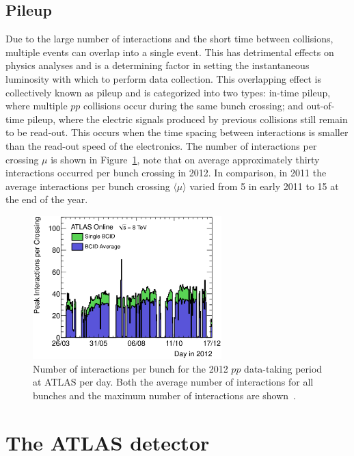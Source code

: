 \subsection{Pileup}

Due to the large number of interactions and the short time between collisions, multiple events can overlap into a single event. This has detrimental effects on physics analyses and is a determining factor in setting the instantaneous luminosity with which to perform data collection. This overlapping effect is collectively known as pileup and is categorized into two types: in-time pileup, where multiple $pp$ collisions occur during the same bunch crossing; and out-of-time pileup, where the electric signals produced by previous collisions still remain to be read-out. This occurs when the time spacing between interactions is smaller than the read-out speed of the electronics. The number of interactions per crossing $\mu$ is shown in Figure~\ref{fig:DetectorBunchCrossingInteractions}, note that on average approximately thirty interactions occurred per bunch crossing in 2012. In comparison, in 2011 the average interactions per bunch crossing $\langle\mu\rangle$ varied from 5 in early 2011 to 15 at the end of the year.

\begin{figure}[htbp]
  \centering
    \includegraphics[width=0.65\textwidth]{PartDetector/Plots/peakBothMuByDay.eps}
    \caption{Number of interactions per bunch for the 2012 $pp$ data-taking period at ATLAS per day. Both the average number of interactions for all bunches and the maximum number of interactions are shown~\cite{Detector:LuminosityResults}.}
  \label{fig:DetectorBunchCrossingInteractions}
\end{figure}

\section{The ATLAS detector} \label{sec:the_atlas_detector}

